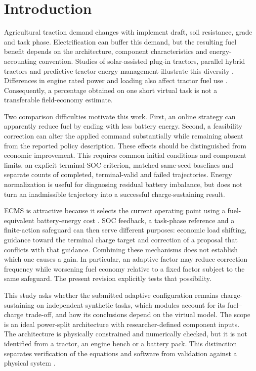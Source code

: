\documentclass[energies,article,submit,moreauthors]{Definitions/mdpi}
\begin{document}
\section{Introduction}
Agricultural traction demand changes with implement draft, soil resistance, grade and task phase. Electrification can buffer this demand, but the resulting fuel benefit depends on the architecture, component characteristics and energy-accounting convention. Studies of solar-assisted plug-in tractors, parallel hybrid tractors and predictive tractor energy management illustrate this diversity \cite{mousazadeh2011,mocera2020,curiel2023}. Differences in engine rated power and loading also affect tractor fuel use \cite{jilek2008,janulevicius2010}. Consequently, a percentage obtained on one short virtual task is not a transferable field-economy estimate.

Two comparison difficulties motivate this work. First, an online strategy can apparently reduce fuel by ending with less battery energy. Second, a feasibility correction can alter the applied command substantially while remaining absent from the reported policy description. These effects should be distinguished from economic improvement. This requires common initial conditions and component limits, an explicit terminal-SOC criterion, matched same-seed baselines and separate counts of completed, terminal-valid and failed trajectories. Energy normalization is useful for diagnosing residual battery imbalance, but does not turn an inadmissible trajectory into a successful charge-sustaining result.

ECMS is attractive because it selects the current operating point using a fuel-equivalent battery-energy cost \cite{musardo2005}. SOC feedback, a task-phase reference and a finite-action safeguard can then serve different purposes: economic load shifting, guidance toward the terminal charge target and correction of a proposal that conflicts with that guidance. Combining these mechanisms does not establish which one causes a gain. In particular, an adaptive factor may reduce correction frequency while worsening fuel economy relative to a fixed factor subject to the same safeguard. The present revision explicitly tests that possibility.

This study asks whether the submitted adaptive configuration remains charge-sustaining on independent synthetic tasks, which modules account for its fuel--charge trade-off, and how its conclusions depend on the virtual model. The scope is an ideal power-split architecture with researcher-defined component inputs. The architecture is physically constrained and numerically checked, but it is not identified from a tractor, an engine bench or a battery pack. This distinction separates verification of the equations and software from validation against a physical system \cite{sargent2013}.
\end{document}
